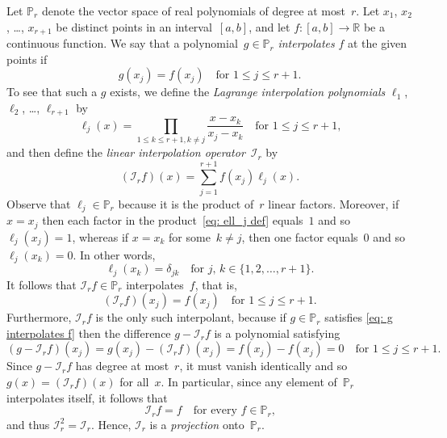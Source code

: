 Let $\mathbb{P}_r$ denote the vector space of real polynomials of degree at 
most~$r$.  Let $x_1$, $x_2$, \dots, $x_{r+1}$ be distinct points in an 
interval~$[a,b]$, and let $f:[a,b]\to\mathbb{R}$ be a continuous function.  We 
say that a polynomial~$g\in\mathbb{P}_r$ \emph{interpolates} $f$ at the given 
points if
\begin{equation}\label{eq: g interpolates f}
g(x_j)=f(x_j)\quad\text{for $1\le j\le r+1$.}
\end{equation}
To see that such a $g$ exists, we define the \emph{Lagrange 
interpolation polynomials} $\ell_1$, $\ell_2$, \dots, $\ell_{r+1}$ by
\begin{equation}\label{eq: ell_j def}
\ell_j(x)=\prod_{1\le k\le r+1, k\ne j}
	\frac{x-x_k}{x_j-x_k}\quad\text{for $1\le j\le r+1$,}
\end{equation}
and then define the \emph{linear interpolation operator}~$\mathcal{I}_r$ by
\[
(\mathcal{I}_rf)(x)=\sum_{j=1}^{r+1}f(x_j)\ell_j(x).
\]
Observe that $\ell_j\in\mathbb{P}_r$ because it is the product of~$r$ linear 
factors.  Moreover, if $x=x_j$ then each factor in the 
product~\eqref{eq: ell_j def} equals~$1$ and so $\ell_j(x_j)=1$, whereas if 
$x=x_k$ for some~$k\ne j$, then one factor equals~$0$ and so $\ell_j(x_k)=0$.
In other words,
\[
\ell_j(x_k)=\delta_{jk}\quad\text{for $j$, $k\in\{1,2,\ldots,r+1\}$.}
\]
It follows that $\mathcal{I}_rf\in\mathbb{P}_r$ interpolates~$f$, that is,
\[
(\mathcal{I}_rf)(x_j)=f(x_j)\quad\text{for $1\le j\le r+1$.}
\]
Furthermore, $\mathcal{I}_rf$ is the only such interpolant, because if 
$g\in\mathbb{P}_r$ satisfies \eqref{eq: g interpolates f} then the difference
$g-\mathcal{I}_rf$ is a polynomial satisfying
\[
(g-\mathcal{I}_rf)(x_j)=g(x_j)-(\mathcal{I}_rf)(x_j)=f(x_j)-f(x_j)=0
	\quad\text{for $1\le j\le r+1$.}
\]
Since $g-\mathcal{I}_rf$ has degree at most~$r$, it must vanish identically and
so $g(x)=(\mathcal{I}_rf)(x)$ for all~$x$. In particular, since any element
of~$\mathbb{P}_r$ interpolates itself, it follows that
\[
\mathcal{I}_rf=f\quad\text{for every $f\in\mathbb{P}_r$,}
\]
and thus $\mathcal{I}_r^2=\mathcal{I}_r$.  Hence, $\mathcal{I}_r$ is a 
\emph{projection} onto~$\mathbb{P}_r$.

